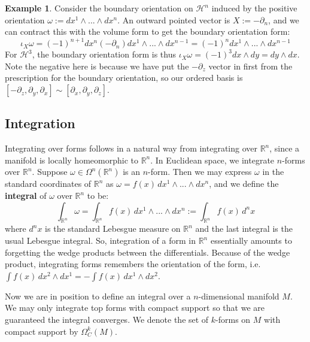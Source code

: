 \documentclass[11pt, oneside]{article}   	%
\theoremstyle{definition}
\newtheorem{example}{Example}[section]
\begin{document}
\begin{example}
	Consider the boundary orientation on $\mathcal H^n$ induced by the positive orientation $\omega := dx^1\wedge ...
	\wedge dx^n$. An outward pointed vector is $X := -\partial_n$, and we can contract this with the volume form to get 
	the boundary orientation form:
	\begin{equation}
		\iota_{X}\omega = (-1)^{n + 1}dx^n(-\partial_n) dx^1\wedge ... \wedge dx^{n - 1} = (-1)^n dx^1\wedge ...\wedge 
		dx^{n - 1}
	\end{equation}
	For $\mathcal H^3$, the boundary orientation form is thus $\iota_X\omega = (-1)^3 dx\wedge dy = dy\wedge dx$. Note 
	the negative here is because we have put the $-\partial_z$ vector in first from the prescription for the boundary 
	orientation, so our ordered basis is $[-\partial_z, \partial_y, \partial_x]\sim [\partial_x, \partial_y, \partial_z]$. 
\end{example}

\subsection{Integration}

Integrating over forms follows in a natural way from integrating over $\mathbb R^n$, since a manifold is locally 
homeomorphic to $\mathbb R^n$. In Euclidean space, we integrate $n$-forms over $\mathbb R^n$. Suppose 
$\omega\in\Omega^n(\mathbb R^n)$ is an $n$-form. Then we may express $\omega$ in the standard coordinates 
of $\mathbb R^n$ as $\omega = f(x)\,dx^1\wedge ...\wedge dx^n$, and we define the \textbf{integral} of $\omega$ 
over $\mathbb R^n$ to be:
\begin{equation}
	\int_{\mathbb R^n}\omega = \int_{\mathbb R^n} f(x)\,dx^1\wedge ...\wedge dx^n := \int_{\mathbb R^n} f(x)\,d^nx
\end{equation}
where $d^nx$ is the standard Lebesgue measure on $\mathbb R^n$ and the last integral is the usual Lebesgue integral. 
So, integration of a form in $\mathbb R^n$ essentially amounts to forgetting the wedge products between the differentials. 
Because of the wedge product, integrating forms remembers the orientation of the form, i.e. $\int f(x)\,dx^2\wedge dx^1 = 
-\int f(x)\,dx^1\wedge dx^2$. 

Now we are in position to define an integral over a $n$-dimensional manifold $M$. We may only integrate top forms with 
compact support so that we are guaranteed the integral converges. We denote the set of $k$-forms on $M$ with compact 
support by $\Omega^k_C(M)$.
\end{document}
